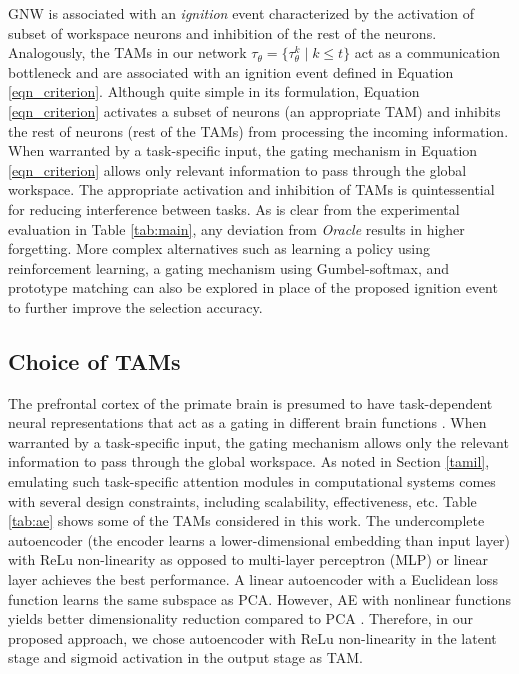 \documentclass{article} %
\begin{document}
 GNW is associated with an \textit{ignition} event \citep{dehaene2003neuronal} characterized by the activation of subset of workspace neurons and inhibition of the rest of the neurons. Analogously, the TAMs in our network $\tau_{\theta} = \{\tau^{k}_{\theta} \mid k \leq t\} $ act as a communication bottleneck and are associated with an ignition event defined in Equation \ref{eqn_criterion}. Although quite simple in its formulation, Equation \ref{eqn_criterion} activates a subset of neurons (an appropriate TAM)  and inhibits the rest of neurons (rest of the TAMs) from processing the incoming information. When warranted by a task-specific input, the gating mechanism in Equation \ref{eqn_criterion} allows only relevant information to pass through the global workspace.  The appropriate activation and inhibition of TAMs is quintessential for reducing interference between tasks. As is clear from the experimental evaluation in Table \ref{tab:main}, any deviation from \textit{Oracle} results in higher forgetting. More complex alternatives such as learning a policy using reinforcement learning, a gating mechanism using Gumbel-softmax, and prototype matching can also be explored in place of the proposed ignition event to further improve the selection accuracy. 


\subsection{Choice of TAMs} \label{tam_choice}
The prefrontal cortex of the primate brain is presumed to have task-dependent neural representations that act as a gating in different brain functions \citep{mante2013context}. When warranted by a task-specific input, the gating mechanism allows only the relevant information to pass through the global workspace. As noted in Section \ref{tamil}, emulating such task-specific attention modules in computational systems comes with several design constraints, including scalability, effectiveness, etc. Table \ref{tab:ae} shows some of the TAMs considered in this work. The undercomplete autoencoder (the encoder learns a lower-dimensional embedding than input layer) with ReLu non-linearity as opposed to multi-layer perceptron (MLP) or linear layer achieves the best performance. A linear autoencoder with a Euclidean loss function learns the same subspace as PCA. However, AE with nonlinear functions yields better dimensionality reduction compared to PCA \citep{hinton2006reducing}. Therefore, in our proposed approach, we chose autoencoder with ReLu non-linearity in the latent stage and sigmoid activation in the output stage as TAM. 
\end{document}

